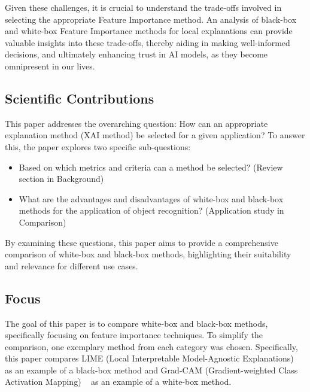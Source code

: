 \documentclass{article}
\begin{document}
Given these challenges, it is crucial to understand the trade-offs involved in selecting the appropriate Feature Importance method. An analysis of black-box and white-box Feature Importance methods for local explanations can provide valuable insights into these trade-offs, thereby aiding in making well-informed decisions, and ultimately enhancing trust in AI models, as they become omnipresent in our lives.



\subsection{Scientific Contributions}
This paper addresses the overarching question: How can an appropriate explanation method (XAI method) be selected for a given application? To answer this, the paper explores two specific sub-questions:

\begin{itemize}
    \item Based on which metrics and criteria can a method be selected? (Review section in Background)
    \item What are the advantages and disadvantages of white-box and black-box methods for the application of object recognition? (Application study in Comparison)
\end{itemize}

By examining these questions, this paper aims to provide a comprehensive comparison of white-box and black-box methods, highlighting their suitability and relevance for different use cases.

\subsection{Focus}

The goal of this paper is to compare white-box and black-box methods, specifically focusing on feature importance techniques. To simplify the comparison, one exemplary method from each category was chosen. Specifically, this paper compares LIME (Local Interpretable Model-Agnostic Explanations) ~\cite{ribeiro2016why} as an example of a black-box method and Grad-CAM (Gradient-weighted Class Activation Mapping) ~\cite{Selvaraju_2019} as an example of a white-box method.


\end{document}
